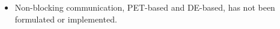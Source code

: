 
\begin{itemize}
\item Non-blocking communication, PET-based and DE-based, has not been formulated or implemented.
\end{itemize}
